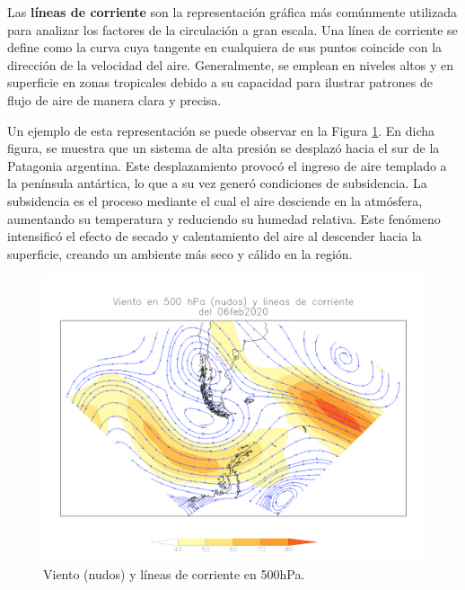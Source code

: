 Las \textbf{líneas de corriente} \cite{recordAntarticos2024} son la representación gráfica más comúnmente utilizada para analizar los factores de la circulación a gran escala. Una línea de corriente se define como la curva cuya tangente en cualquiera de sus puntos coincide con la dirección de la velocidad del aire. Generalmente, se emplean en niveles altos y en superficie en zonas tropicales debido a su capacidad para ilustrar patrones de flujo de aire de manera clara y precisa.

Un ejemplo de esta representación se puede observar en la Figura \ref{fig:mapaLineas}. En dicha figura, se muestra que un sistema de alta presión se desplazó hacia el sur de la Patagonia argentina. Este desplazamiento provocó el ingreso de aire templado a la península antártica, lo que a su vez generó condiciones de subsidencia. La subsidencia es el proceso mediante el cual el aire desciende en la atmósfera, aumentando su temperatura y reduciendo su humedad relativa. Este fenómeno intensificó el efecto de secado y calentamiento del aire al descender hacia la superficie, creando un ambiente más seco y cálido en la región.


\begin{figure}[H]
    \centering
    \includegraphics[width=1\linewidth]{Figuras/viento/mapalineasViento.png}
    \caption{Viento (nudos) y líneas de corriente en 500\unit{\hecto\pascal}. \cite{recordAntarticos2024}}
    \label{fig:mapaLineas}
\end{figure}


